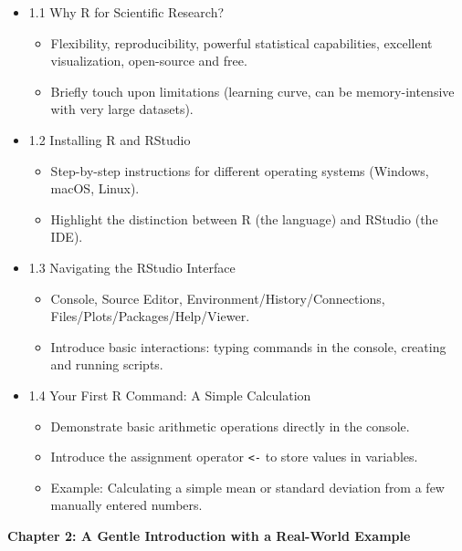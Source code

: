 \documentclass[
  letterpaper,
  DIV=11,
  numbers=noendperiod]{scrreprt}
\providecommand{\tightlist}{%
  \setlength{\itemsep}{0pt}\setlength{\parskip}{0pt}}\usepackage{longtable,booktabs,array}
\begin{document}
\begin{itemize}
\tightlist
\item
  1.1 Why R for Scientific Research?

  \begin{itemize}
  \tightlist
  \item
    Flexibility, reproducibility, powerful statistical capabilities,
    excellent visualization, open-source and free.
  \item
    Briefly touch upon limitations (learning curve, can be
    memory-intensive with very large datasets).
  \end{itemize}
\item
  1.2 Installing R and RStudio

  \begin{itemize}
  \tightlist
  \item
    Step-by-step instructions for different operating systems (Windows,
    macOS, Linux).
  \item
    Highlight the distinction between R (the language) and RStudio (the
    IDE).
  \end{itemize}
\item
  1.3 Navigating the RStudio Interface

  \begin{itemize}
  \tightlist
  \item
    Console, Source Editor, Environment/History/Connections,
    Files/Plots/Packages/Help/Viewer.
  \item
    Introduce basic interactions: typing commands in the console,
    creating and running scripts.
  \end{itemize}
\item
  1.4 Your First R Command: A Simple Calculation

  \begin{itemize}
  \tightlist
  \item
    Demonstrate basic arithmetic operations directly in the console.
  \item
    Introduce the assignment operator \texttt{\textless{}-} to store
    values in variables.
  \item
    Example: Calculating a simple mean or standard deviation from a few
    manually entered numbers.
  \end{itemize}
\end{itemize}

\textbf{Chapter 2: A Gentle Introduction with a Real-World Example}
\end{document}
